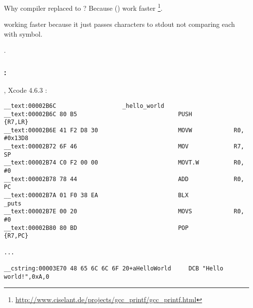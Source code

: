 {Why compiler replaced \printf to \puts? Because \puts() work faster}
\footnote{\url{http://www.ciselant.de/projects/gcc_printf/gcc_printf.html}}. 

{\puts working faster because it just passes characters to stdout not comparing each with \IT{\%} symbol.}

 .

\subsubsection{\OptimizingXcode: }

, Xcode 4.6.3 :

\begin{lstlisting}
__text:00002B6C                   _hello_world
__text:00002B6C 80 B5                             PUSH            {R7,LR}
__text:00002B6E 41 F2 D8 30                       MOVW            R0, #0x13D8
__text:00002B72 6F 46                             MOV             R7, SP
__text:00002B74 C0 F2 00 00                       MOVT.W          R0, #0
__text:00002B78 78 44                             ADD             R0, PC
__text:00002B7A 01 F0 38 EA                       BLX             _puts
__text:00002B7E 00 20                             MOVS            R0, #0
__text:00002B80 80 BD                             POP             {R7,PC}

...

__cstring:00003E70 48 65 6C 6C 6F 20+aHelloWorld     DCB "Hello world!",0xA,0
\end{lstlisting}

